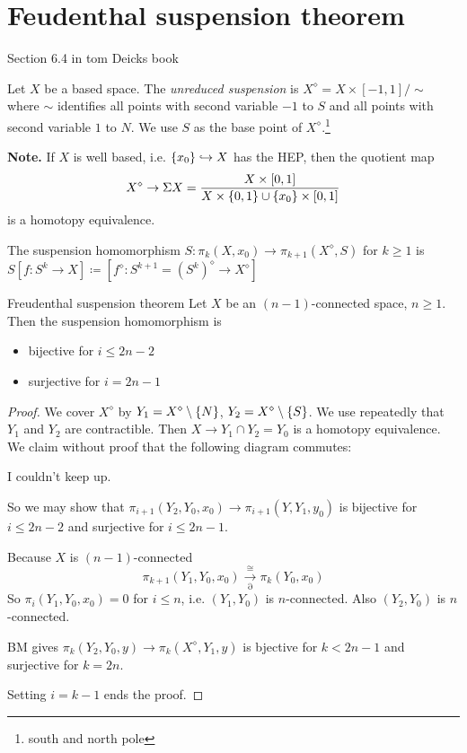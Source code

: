 \documentclass[language=english]{TemplateLecture}
\begin{document}
\section{Feudenthal suspension theorem}
Section 6.4 in tom Deicks book

\begin{defi}{}{}
    Let \(X\) be a based space. The \emph{unreduced suspension} is \(X^\diamond = X\times [-1,1]/\sim\) where \(\sim\) identifies all points with second variable \(-1\) to \(S\) and all points with second variable \(1\) to \(N\). We use \(S\) as the base point of \(X^\diamond\).\footnote{south and north pole}
\end{defi}

\textbf{Note.} If \(X\) is well based, i.e. \(\{x_0\} \hookrightarrow X\) has the HEP, then the quotient map
\[X^\diamond \to \Sigma X = \frac{X\times [0,1]}{X\times \{0,1\}\cup \{x_0\}\times [0,1]}\]
is a homotopy equivalence.

The suspension homomorphism \(S\colon \pi_k(X,x_0) \to \pi_{k+1}(X^\diamond, S)\) for \(k \geq 1\) is \(S[f\colon S^k \to X] \coloneq [f^\diamond \colon S^{k+1}= (S^k)^\diamond \to X^\diamond]\)

\begin{thm}{Freudenthal suspension theorem}{}
    Let \(X\) be an \((n-1)\)-connected space, \(n \geq 1\). Then the suspension homomorphism is \begin{itemize}
        \item bijective for \(i\leq 2n-2\)
        \item surjective for \(i = 2n-1\)
    \end{itemize}
\end{thm}

\begin{proof}
    We cover \(X^\diamond\) by \(Y_1 = X^\diamond \setminus \{N\}\), \(Y_2 = X^\diamond \setminus \{S\}\). We use repeatedly that \(Y_1\) and \(Y_2\) are contractible. Then \(X\to Y_1\cap Y_2 = Y_0\) is a homotopy equivalence. We claim without proof that the following diagram commutes:

    I couldn't keep up.

    So we may show that \(\pi_{i+1} (Y_2, Y_0, x_0)\to \pi_{i+1}(Y, Y_1, y_0)\) is bijective for \(i \leq 2n-2\) and surjective for \(i \leq 2n-1\).

    Because \(X\) is \((n-1)\)-connected
    \[\pi_{k+1}(Y_1, Y_0, x_0) \xrightarrow[\partial]{\cong} \pi_k(Y_0, x_0)\]
    So \(\pi_i(Y_1, Y_0, x_0) = 0\) for \(i \leq n\), i.e. \((Y_1, Y_0)\) is \(n\)-connected. Also \((Y_2, Y_0)\) is \(n\)-connected.

    BM gives \(\pi_k(Y_2, Y_0, y) \to \pi_k(X^\diamond, Y_1, y)\) is bjective for \(k < 2n-1\) and surjective for \(k = 2n\).

    Setting \(i = k-1\) ends the proof.
\end{proof}
\end{document}
